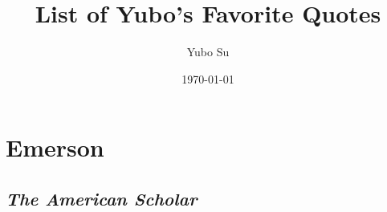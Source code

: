 \documentclass[12pt]{article}
\begin{document}
\onehalfspacing

\pagestyle{fancy}
\cfoot{\thepage/\pageref{LastPage}}

\title{List of Yubo's Favorite Quotes}
\author{Yubo Su}
\date{\today}

\maketitle

\tableofcontents

\clearpage

\section{Emerson}

\subsection{\emph{The American Scholar}}
\end{document}
